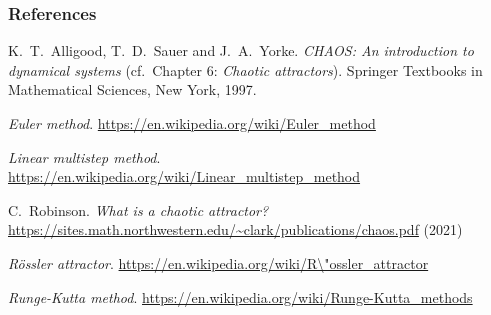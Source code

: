 \documentclass[usenames,svgnames,dvipsnames,10pt]{beamer}
\begin{document}
\begin{frame}[t,allowframebreaks] 
\frametitle{References} 

\footnotesize 
\begin{thebibliography}{10}

K.~T.~Alligood, T.~D.~Sauer and J.~A.~Yorke. 
\emph{CHAOS: An introduction to dynamical systems} 
(cf.\ Chapter 6: \emph{Chaotic attractors}). 
Springer Textbooks in Mathematical Sciences, New York, 1997. 

\emph{Euler method}. \url{https://en.wikipedia.org/wiki/Euler_method}

\emph{Linear multistep method}. \url{https://en.wikipedia.org/wiki/Linear_multistep_method} 

C.~Robinson. \emph{What is a chaotic attractor?} 
\url{https://sites.math.northwestern.edu/~clark/publications/chaos.pdf} (2021)

\emph{R\"ossler attractor}. \url{https://en.wikipedia.org/wiki/R\"ossler_attractor}

\emph{Runge-Kutta method}. \url{https://en.wikipedia.org/wiki/Runge-Kutta_methods} 

\end{thebibliography}

\end{frame} 

\end{document}
